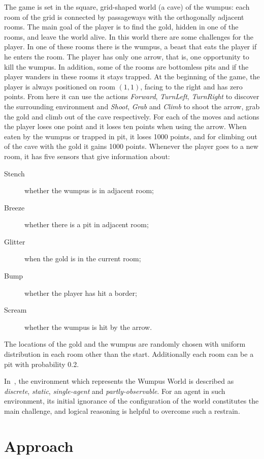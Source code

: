 \documentclass{llncs}
\begin{document}
The game is set in the square, grid-shaped world (a cave) of the wumpus: each room of the grid is connected by passageways with the orthogonally adjacent rooms.
The main goal of the player is to find the gold, hidden in one of the rooms, and leave the world alive.
In this world there are some challenges for the player.
In one of these rooms there is the wumpus, a beast that eats the player if he enters the room. The player has only one arrow, that is, one opportunity to kill the wumpus. In addition, some of the rooms are bottomless pits and if the player wanders in these rooms it stays trapped. At the beginning of the game, the player is always positioned on room $(1,1)$, facing to the right and has zero points. From here it can use the actions \emph{Forward}, \emph{TurnLeft}, \emph{TurnRight} to discover the surrounding environment and \emph{Shoot}, \emph{Grab} and \emph{Climb} to shoot the arrow, grab the gold and climb out of the cave respectively. For each of the moves and actions the player loses one point and it loses ten points when using the arrow. When eaten by the wumpus or trapped in pit, it loses 1000 points, and for climbing out of the cave with the gold it gains 1000 points. Whenever the player goes to a new room, it has five sensors that give information about:
\begin{description}
	\item[Stench]{whether the wumpus is in adjacent room;}
	\item[Breeze]{whether there is a pit in adjacent room;}
	\item[Glitter]{when the gold is in the current room;}
	\item[Bump]{whether the player has hit a border;}
	\item[Scream]{whether the wumpus is hit by the arrow.}
\end{description}
The locations of the gold and the wumpus are randomly chosen with uniform distribution in each room other than the start. Additionally each room can be a pit with probability 0.2.

In~\cite{book:aima}, the environment which represents the Wumpus World is described as \emph{discrete}, \emph{static}, \emph{single-agent} and \emph{partly-observable}. For an agent in such environment, its initial ignorance of the configuration of the world constitutes the main challenge, and logical reasoning is helpful to overcome such a restrain.

\section{Approach}
\end{document}
